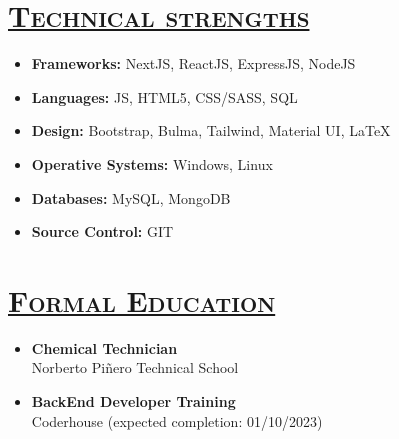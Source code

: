 \documentclass{resume} %
\begin{document}
\vspace{7px}
\begin{multicols}{2}






    
    \section*{\textsc{\underline{Technical strengths}}}
    \begin{itemize}
    \setlength\itemsep{-15px}
        \item \textbf{Frameworks:} NextJS, ReactJS, ExpressJS, NodeJS\\
        \item \textbf{Languages:} JS, HTML5, CSS/SASS, SQL\\
        \item \textbf{Design:} Bootstrap, Bulma, Tailwind, Material UI, \LaTeX\\
        \item \textbf{Operative Systems:} Windows, Linux\\
        \item \textbf{Databases:} MySQL, MongoDB\\
        \item \textbf{Source Control:} GIT\\
    \end{itemize}

    
    \columnbreak

    \section*{\textsc{\underline{Formal Education}}}

    \begin{itemize}
      \setlength\itemsep{-15px}
      \item \textbf{Chemical Technician}\\\textcolor{light-gray}{Norberto Pi\~nero Technical School}
    \end{itemize}

    \begin{itemize}
      \setlength\itemsep{-15px}
      \item \textbf{BackEnd Developer Training}\\\textcolor{light-gray}{Coderhouse (expected completion: 01/10/2023)}
    \end{itemize}


\end{multicols}
\end{document}
